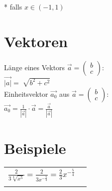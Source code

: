 \documentclass[../main.tex]{subfiles}
\begin{document}
* falls $x \in (-1,1)$

\section{Vektoren}
Länge eines Vektors $\vec{a}=\begin{pmatrix}b\\c\end{pmatrix}$: \\
$\vec{|a|}=\sqrt[]{b^2+c^2}$ \\ [7pt]
Einheitsvektor $\vec{a_0}$ aus $\vec{a}=\begin{pmatrix}b\\c\end{pmatrix}$: \\
$\vec{a_0}=\frac{1}{|\vec{a}|}\cdot\vec{a}=\frac{\vec{a}}{|\vec{a}|}$



\section{Beispiele}

\begin{tabularx}{1\textwidth} { 
    >{\centering\arraybackslash}X 
    >{\centering\arraybackslash}X  }
    \begin{math}
       \frac{2}{3\sqrt[4]{x^5}} = \frac{2}{3x^{-\frac{5}{4}}} = \frac{2}{3}x^{-\frac{5}{4}}
    \end{math}
    &
    \begin{math}
        {}
    \end{math}
    \\ [7pt]
    \begin{math}
        {}
    \end{math}
    &
    \begin{math}
        {}
    \end{math}
    \\ [7pt]
\end{tabularx}
\end{document}

